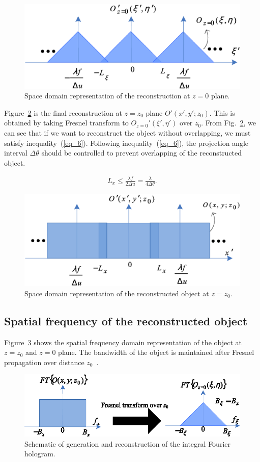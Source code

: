 \documentclass[10pt,letterpaper]{article}
\begin{document}
\begin{figure}[htbp]
\centering\includegraphics[width=.4\columnwidth]{fig_4}
\caption{Space domain representation of the reconstruction at $z=0$ plane.}
\label{fig_4}
\end{figure}

Figure~\ref{fig_5} is the final reconstruction at $z=z_0$ plane $O'(x', y'; z_0)$. This is obtained by taking Fresnel transform to $O_{z=0}'(\xi', \eta')$ over $z_0$. From Fig.~\ref{fig_5}, we can see that if we want to reconstruct the object without overlapping, we must satisfy inequality~(\ref{eq_6}). Following inequality~(\ref{eq_6}), the projection angle interval $\Delta\theta$ should be controlled to prevent overlapping of the reconstructed object.

\begin{equation}
\begin{aligned}
{L_x} \leqslant \frac{{\lambda f}}{{2\Delta u}} = \frac{\lambda }{{4\Delta \theta }}.
\end{aligned}
\label{eq_6}
\end{equation}

\begin{figure}[htbp]
\centering\includegraphics[width=.4\columnwidth]{fig_5}
\caption{Space domain representation of the reconstructed object at $z=z_0$.}
\label{fig_5}
\end{figure}

\subsection{Spatial frequency of the reconstructed object}
Figure~\ref{fig_6} shows the spatial frequency domain representation of the object at $z=z_0$ and $z=0$ plane. The bandwidth of the object is maintained after Fresnel propagation over distance $z_0$~\cite{Stern_2004_JOSA,Stern_2006_JOSA}.

\begin{figure}[htbp]
\centering\includegraphics[width=.5\columnwidth]{fig_6}
\caption{Schematic of generation and reconstruction of the integral Fourier hologram.}
\label{fig_6}
\end{figure}
\end{document}
